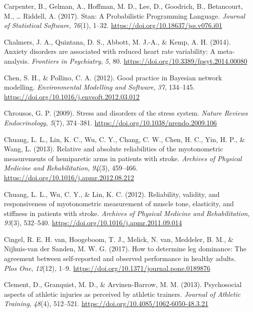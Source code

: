 \documentclass[
  english,
  man,floatsintext]{apa6}
\begin{document}
\leavevmode\hypertarget{ref-Carpenter2017}{}%
Carpenter, B., Gelman, A., Hoffman, M. D., Lee, D., Goodrich, B., Betancourt, M., \ldots{} Riddell, A. (2017). Stan: A Probabilistic Programming Language. \emph{Journal of Statistical Software}, \emph{76}(1), 1--32. \url{https://doi.org/10.18637/jss.v076.i01}

\leavevmode\hypertarget{ref-Chalmers2014}{}%
Chalmers, J. A., Quintana, D. S., Abbott, M. J.-A., \& Kemp, A. H. (2014). Anxiety disorders are associated with reduced heart rate variability: A meta-analysis. \emph{Frontiers in Psychiatry}, \emph{5}, 80. \url{https://doi.org/10.3389/fpsyt.2014.00080}

\leavevmode\hypertarget{ref-Chen2012}{}%
Chen, S. H., \& Pollino, C. A. (2012). Good practice in Bayesian network modelling. \emph{Environmental Modelling and Software}, \emph{37}, 134--145. \url{https://doi.org/10.1016/j.envsoft.2012.03.012}

\leavevmode\hypertarget{ref-Chrousos2009}{}%
Chrousos, G. P. (2009). Stress and disorders of the stress system. \emph{Nature Reviews Endocrinology}, \emph{5}(7), 374--381. \url{https://doi.org/10.1038/nrendo.2009.106}

\leavevmode\hypertarget{ref-Chuang2013}{}%
Chuang, L. L., Lin, K. C., Wu, C. Y., Chang, C. W., Chen, H. C., Yin, H. P., \& Wang, L. (2013). Relative and absolute reliabilities of the myotonometric measurements of hemiparetic arms in patients with stroke. \emph{Archives of Physical Medicine and Rehabilitation}, \emph{94}(3), 459--466. \url{https://doi.org/10.1016/j.apmr.2012.08.212}

\leavevmode\hypertarget{ref-Chuang2012}{}%
Chuang, L. L., Wu, C. Y., \& Lin, K. C. (2012). Reliability, validity, and responsiveness of myotonometric measurement of muscle tone, elasticity, and stiffness in patients with stroke. \emph{Archives of Physical Medicine and Rehabilitation}, \emph{93}(3), 532--540. \url{https://doi.org/10.1016/j.apmr.2011.09.014}

\leavevmode\hypertarget{ref-VanCingel2017}{}%
Cingel, R. E. H. van, Hoogeboom, T. J., Melick, N. van, Meddeler, B. M., \& Nijhuis-van der Sanden, M. W. G. (2017). How to determine leg dominance: The agreement between self-reported and observed performance in healthy adults. \emph{Plos One}, \emph{12}(12), 1--9. \url{https://doi.org/10.1371/journal.pone.0189876}

\leavevmode\hypertarget{ref-Clement2013}{}%
Clement, D., Granquist, M. D., \& Arvinen-Barrow, M. M. (2013). Psychosocial aspects of athletic injuries as perceived by athletic trainers. \emph{Journal of Athletic Training}, \emph{48}(4), 512--521. \url{https://doi.org/10.4085/1062-6050-48.3.21}
\end{document}
